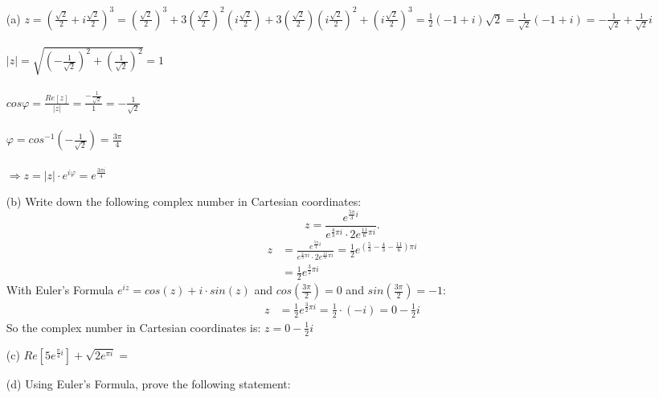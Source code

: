 \documentclass[12pt]{article}
\begin{document}
\begin{itemize}
    \item[(a)]
    $z = (\frac{\sqrt{2}}{2}+i\frac{\sqrt{2}}{2})^{3} = (\frac{\sqrt{2}}{2})^{3} + 3(\frac{\sqrt{2}}{2})^{2}(i\frac{\sqrt{2}}{2}) + 3(\frac{\sqrt{2}}{2})(i\frac{\sqrt{2}}{2})^{2} + (i\frac{\sqrt{2}}{2})^{3} = \frac{1}{2}(-1+i)\sqrt{2}=\frac{1}{\sqrt{2}}(-1+i)=-\frac{1}{\sqrt{2}}+\frac{1}{\sqrt{2}}i$\\\\
    $|z|=\sqrt{(-\frac{1}{\sqrt{2}})^{2}+(\frac{1}{\sqrt{2}})^{2}}=1$\\\\
    $cos\varphi=\frac{Re[z]}{|z|}=\frac{-\frac{1}{\sqrt{2}}}{1}=-\frac{1}{\sqrt{2}}$\\\\
    $\varphi=cos^{-1}(-\frac{1}{\sqrt{2}})=\frac{3\pi}{4}$\\\\
    $\Rightarrow z=|z|\cdot e^{i\varphi}=e^{\frac{3\pi i}{4}}$

    \item[(b)]
    Write down the following complex number in Cartesian coordinates:
   $$z = \frac{e^{\frac{5\pi}{3}i}}{e^{\frac{4}{3}\pi i} \cdot 2 e^{\frac{11}{6}\pi i}}.$$
\begin{align*}
   z &= \frac{e^{\frac{5\pi}{3}i}}{e^{\frac{4}{3}\pi i} \cdot 2 e^{\frac{11}{6}\pi i}} = \frac{1}{2} e^{\left(\frac{5}{3} - \frac{4}{3} - \frac{11}{6}\right)\pi i} \\
   &= \frac{1}{2} e^{\frac{3}{2}\pi i}
\end{align*}
With Euler's Formula $e^{iz} = cos(z) + i \cdot sin(z)$ and $cos\left(\frac{3 \pi}{2}\right) = 0$ and $sin\left(\frac{3 \pi}{2}\right) = -1$:
\begin{align*}
   z &= \frac{1}{2} e^{\frac{3}{2}\pi i} = \frac{1}{2} \cdot (-i) = 0 - \frac{1}{2} i
\end{align*}
So the complex number in Cartesian coordinates is: $z =0 - \frac{1}{2} i$
    \item[(c)]
    $Re[5e^{\frac{\pi}{4}i}]+\sqrt{2e^{\pi i}} = $
    \item[(d)]
    Using Euler's Formula, prove the following statement:


\end{itemize}
\end{document}
